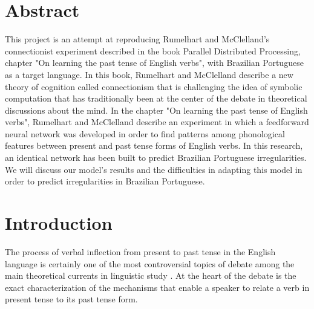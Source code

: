 \documentclass[a0,portrait]{a0poster}
\begin{document}
\begin{multicols}{2} %


\color{DB} %

\section*{Abstract}
\normalsize{ \color{darkgray}
 This project is an attempt at reproducing Rumelhart and McClelland's \cite{rumelhart:1986} connectionist experiment described in the book Parallel Distributed Processing, chapter "On learning the past tense of English verbs", with Brazilian Portuguese as a target language. In this book, Rumelhart and McClelland describe a new theory of cognition called connectionism that is challenging the idea of symbolic computation that has traditionally been at the center of the debate in theoretical discussions about the mind. In the chapter "On learning the past tense of English verbs", Rumelhart and McClelland describe an experiment in which a feedforward neural network was developed in order to find patterns among phonological features between present and past tense forms of English verbs. In this research, an identical network has been built to predict Brazilian Portuguese irregularities. We will discuss our model's results and the difficulties in adapting this model in order to predict irregularities in Brazilian Portuguese.
}


\color{DB} %

\section*{Introduction}
\normalsize{ \color{darkgray}
The process of verbal inflection from present to past tense in the English language is certainly one of the most controversial topics of debate among the main theoretical currents in linguistic study \cite{chomsky:1968,Pinker:1988,rumelhart:1986}.  At the heart of the debate is the exact characterization of the mechanisms that enable a speaker to relate a verb in present tense to its past tense form. 

}
\end{multicols}
\end{document}
